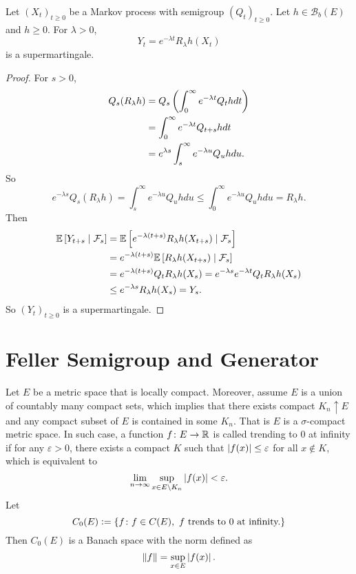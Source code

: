 \begin{lem}
    Let $(X_t)_{t \geq 0}$ be a Markov process with semigroup $(Q_t)_{t \geq 0}$. Let $h \in \mathcal{B}_b(E)$ and $h \geq 0$. For $\lambda > 0 $, 
    \begin{equation*}
        Y_t = e^{-\lambda t}R_\lambda h (X_t)
    \end{equation*}
    is a supermartingale.
\end{lem}
\begin{proof}
    For $s > 0$,
    \begin{align*}
        Q_s(R_\lambda h) &= Q_s \left(\int_0^\infty e^{-\lambda t} Q_t h dt\right) \\
        &= \int_0^\infty e^{-\lambda t} Q_{t+s} h dt \\
        &= e^{\lambda s}\int_s^\infty e^{-\lambda u}Q_u h du.
    \end{align*}
    So
    \begin{equation*}
        e^{-\lambda s}Q_s(R_\lambda h) = \int_s^\infty e^{-\lambda u}Q_u h du \leq \int_0^\infty e^{-\lambda u}Q_u h du = R_\lambda h.
    \end{equation*}
    Then
    \begin{align*}
        \mathbb{E}\left[Y_{t+s} \mid \mathcal{F}_s\right] &= \mathbb{E}\left[e^{-\lambda (t+s)}R_\lambda h (X_{t+s}) \mid \mathcal{F}_s\right] \\
        &= e^{-\lambda (t+s)}\mathbb{E}\left[R_\lambda h (X_{t+s}) \mid \mathcal{F}_s\right] \\
        &= e^{-\lambda (t+s)} Q_tR_\lambda h (X_s) = e^{-\lambda s} e^{-\lambda t} Q_tR_\lambda h (X_s)\\
        &\leq e^{-\lambda s}R_\lambda h (X_s) = Y_s.
    \end{align*}
    So $(Y_t)_{t \geq 0}$ is a supermartingale.
\end{proof}


\section{Feller Semigroup and Generator}

Let $E$ be a metric space that is locally compact. Moreover, assume $E$ is a union of countably many compact sets, which implies that there exists compact $K_n \uparrow E$ and any compact subset of $E$ is contained in some $K_n$. That is $E$ is a $\sigma$-compact metric space. In such case, a function $f \colon E \rightarrow \mathbb{R}$ is called trending to $0$ at infinity if for any $\varepsilon > 0$, there exists a compact $K$ such that $\left\lvert f(x)\right\lvert \leq \varepsilon$ for all $x \notin K$, which is equivalent to 
\begin{equation*}
    \lim_{n \rightarrow \infty} \sup_{x \in E \backslash K_n} \left\lvert f(x)\right\lvert < \varepsilon.
\end{equation*}
Let
\begin{equation*}
    C_0(E) \vcentcolon= \left\{f \colon f \in C(E),~ f \text{ trends to } 0 \text{ at infinity.}\right\}
\end{equation*}
Then $C_0(E)$ is a Banach space with the norm defined as
\begin{equation*}
    \left\lVert f\right\lVert = \sup_{x \in E} \left\lvert f(x)\right\lvert.
\end{equation*}

